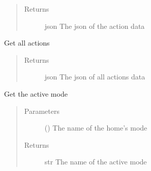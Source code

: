 \documentclass[letterpaper,10pt,english]{sphinxmanual}
\begin{document}
\begin{fulllineitems}
\begin{fulllineitems}
\begin{quote}
\begin{description}
\item[{Returns}] \leavevmode
\sphinxAtStartPar
json \textendash{} The json of the action data

\end{description}\end{quote}

\end{fulllineitems}


\begin{fulllineitems}
\label{\detokenize{index:Api.Api.get_actions}}
\sphinxAtStartPar
Get all actions
\begin{quote}\begin{description}
\item[{Returns}] \leavevmode
\sphinxAtStartPar
json \textendash{} The json of all actions data

\end{description}\end{quote}

\end{fulllineitems}


\begin{fulllineitems}
\label{\detokenize{index:Api.Api.get_active_mode}}
\sphinxAtStartPar
Get the active mode
\begin{quote}\begin{description}
\item[{Parameters}] \leavevmode
\sphinxAtStartPar
{} () \textendash{} The name of the home’s mode

\item[{Returns}] \leavevmode
\sphinxAtStartPar
str \textendash{} The name of the active mode

\end{description}\end{quote}

\end{fulllineitems}



\end{fulllineitems}
\end{document}
